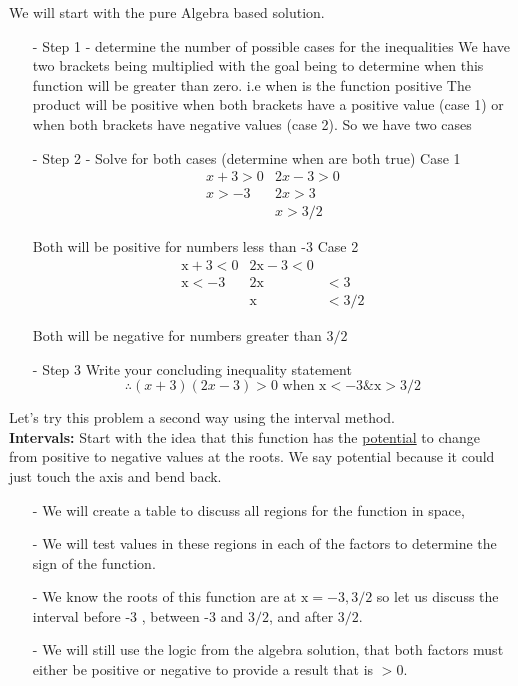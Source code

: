 \documentclass{article}
\begin{document}
We will start with the pure Algebra based solution.
\begin{itemize}
    \item[-] Step 1 - determine the number of possible cases for the inequalities
We have two brackets being multiplied with the goal being to determine when this function will be greater than zero. i.e when is the function positive
The product will be positive when both brackets have a positive value (case 1) or when both brackets have negative values (case 2).
So we have two cases
\item[-] Step 2 - Solve for both cases (determine when are both true)
Case 1
$$
\begin{array}{ll}
x+3>0 & 2 x-3>0 \\
x>-3 & 2 x>3 \\
& x>3 / 2
\end{array}
$$

Both will be positive for numbers less than -3
Case 2
$$
\begin{array}{lll}
\mathrm{x}+3<0 & 2 \mathrm{x}-3<0 \\
\mathrm{x}<-3 & 2 \mathrm{x} & <3 \\
& \mathrm{x} & <3 / 2
\end{array}
$$

Both will be negative for numbers greater than $3 / 2$
\item[-] Step 3 Write your concluding inequality statement
$$
\therefore(x+3)(2 x-3)>0 \text { when } \mathrm{x}<-3 \& \mathrm{x}>3 / 2
$$
\end{itemize}
\newpage 
Let's try this problem a second way using the interval method.\\
\textbf{Intervals:} Start with the idea that this function has the \underline{potential} to change from positive to negative values at the roots. We say potential because it could just touch the axis and bend back.\\
\begin{itemize}
    \item [-] We will create a table to discuss all regions for the function in space,
\item[-] We will test values in these regions in each of the factors to determine the sign of the function.
\item[-] We know the roots of this function are at $\mathrm{x}=-3,3 / 2$ so let us discuss the interval before -3 , between -3 and $3 / 2$, and after $3 / 2$.
\item[-] We will still use the logic from the algebra solution, that both factors must either be positive or negative to provide a result that is $>0$.
\end{itemize}
\end{document}
